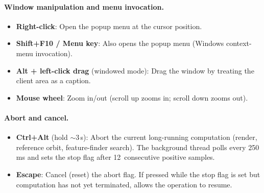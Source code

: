 \paragraph{Window manipulation and menu invocation.}
\begin{itemize}
  \item \textbf{Right-click}: Open the popup menu at the cursor position.
  \item \textbf{Shift+F10 / Menu key}: Also opens the popup menu (Windows context-menu invocation).
  \item \textbf{Alt + left-click drag} (windowed mode): Drag the window by treating the client area as a caption.
  \item \textbf{Mouse wheel}: Zoom in/out (scroll up zooms in; scroll down zooms out).
\end{itemize}

\paragraph{Abort and cancel.}
\begin{itemize}
  \item \textbf{Ctrl+Alt} (hold ${\sim}$3\,s): Abort the current long-running
        computation (render, reference orbit, feature-finder search).
        The  background thread polls every 250\,ms
        and sets the stop flag after 12~consecutive positive samples.
  \item \textbf{Escape}: Cancel (reset) the abort flag.  If pressed
        while the stop flag is set but computation has not yet
        terminated, allows the operation to resume.
\end{itemize}

